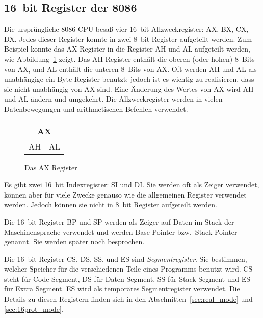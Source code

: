 \subsection{16~bit Register der 8086}

Die urspr\"{u}ngliche 8086 CPU besa{\ss} vier 16~bit Allzweckregister: AX,
BX, CX, DX\@. Jedes dieser Register konnte in zwei 8~bit Register
aufgeteilt werden. Zum Beispiel konnte das AX-Register in die
Register AH und AL aufgeteilt werden, wie Abbildung~\ref{fig:AX_reg}
zeigt. Das AH Register enth\"{a}lt die oberen (oder hohen) 8~Bits von
AX, und AL enth\"{a}lt die unteren 8~Bits von AX\@. Oft werden AH und AL
als unabh\"{a}ngige ein-Byte Register benutzt; jedoch ist es wichtig zu
realisieren, dass sie nicht unabh\"{a}ngig von AX sind. Eine \"{A}nderung
des Wertes von AX wird AH und AL \"{a}ndern und umgekehrt. Die
Allzweckregister werden in vielen Datenbewegungen und arithmetischen
Befehlen verwendet.

\begin{figure}[ht]
\begin{center}
\begin{tabular}{cc}
\multicolumn{2}{c}{AX} \\
 \hline
 \multicolumn{1}{||c|}{AH} & \multicolumn{1}{c||}{AL} \\
 \hline
\end{tabular}
\caption{Das AX Register \label{fig:AX_reg} }
\end{center}
\end{figure}

Es gibt zwei 16~bit Indexregister: SI und
DI\@. Sie werden oft als Zeiger verwendet, k\"{o}nnen aber
f\"{u}r viele Zwecke genauso wie die allgemeinen Register verwendet
werden. Jedoch k\"{o}nnen sie nicht in 8~bit Register aufgeteilt werden.

Die 16~bit Register BP und SP werden als Zeiger auf Daten im Stack
der Maschinensprache verwendet und werden Base Pointer
  bzw.\ Stack
Pointer   genannt.
Sie werden sp\"{a}ter noch besprochen.

Die 16~bit Register CS, DS, SS, und ES sind \emph{Segmentregister}.
 Sie bestimmen, welcher Speicher f\"{u}r die
verschiedenen Teile eines Programms benutzt wird. CS steht f\"{u}r Code
Segment, DS f\"{u}r Daten Segment, SS f\"{u}r Stack Segment und ES f\"{u}r Extra
Segment. ES wird als tempor\"{a}res Segmentregister verwendet. Die
Details zu diesen Registern finden sich in den
Abschnitten~\ref{sec:real_mode} und \ref{sec:16prot_mode}.

